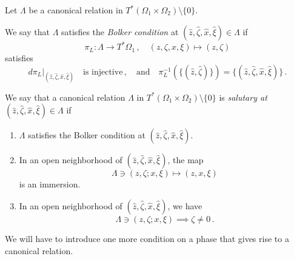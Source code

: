 \documentclass[
	fontsize=11pt, 
	twoside=false, 
	abstract=true, 
	a4paper,
]{scrartcl}
\newcommand{\sem}{\setminus\{0\}}
\newcommand{\an}{\quad\text{and}\quad}
\begin{document}
\begin{definition}\label{def:admisCR}
	Let $\Lambda$ be a canonical relation in $T^\ast(\Omega_1\times\Omega_2)\sem$.

	We say that $\Lambda$ satisfies the \emph{Bolker condition} at $(\hat z,\hat \zeta, \hat x, \hat \xi) \in \Lambda$ if 
	\[
		\pi_L \colon \Lambda\to T^\ast \Omega_1\,,\quad (z,\zeta,x,\xi)\mapsto (z,\zeta)
	\]
	satisfies 
	\begin{equation*}%
		d\pi_L\vert_{(\hat z, \hat \zeta, \hat x, \hat \xi)}\quad\text{is injective}\,,\an\pi_L^{-1}(\{(\hat z, \hat \zeta)\}) = \{(\hat z, \hat \zeta, \hat x, \hat \xi)\}\,.
	\end{equation*}

	We say that a canonical relation $\Lambda$ in $T^\ast(\Omega_1\times\Omega_2)\sem$ is \emph{salutary at} $(\hat z,\hat \zeta, \hat x, \hat \xi) \in \Lambda$ if
	\begin{enumerate}[label=$\mathrm{ph}$\arabic*.]%
		\item\label{as:n1} $\Lambda$ satisfies the Bolker condition at $(\hat z, \hat\zeta,\hat x, \hat \xi)$.
		\item\label{as:n2} In an open neighborhood of $(\hat z,\hat \zeta, \hat x, \hat \xi)$, the map 
				\[
					\Lambda \ni (z,\zeta; x,\xi)\mapsto (z,x,\xi)
				\]
				is an immersion.
		\item\label{as:n3} In an open neighborhood of $(\hat z,\hat \zeta, \hat x, \hat \xi)$, we have
			\[
				\Lambda \ni (z,\zeta ;x,\xi) \implies \zeta \neq 0\,.
			\]
	\end{enumerate}
\end{definition}

We will have to introduce one more condition on a phase that gives rise to a canonical relation.%
\end{document}
